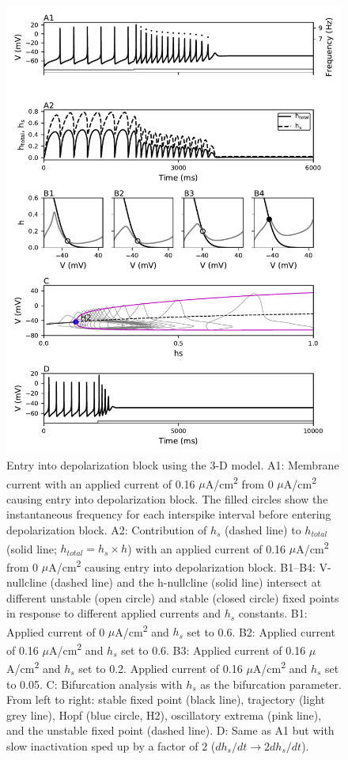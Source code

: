 \begin{figure}
	\centering
	\includegraphics[scale=0.7]{../figures/figure_3.pdf}
	\caption{Entry into depolarization block using the 3-D model. A1: Membrane current with an applied current of 0.16 $\mu$A/cm\textsuperscript{2} from 0 $\mu$A/cm\textsuperscript{2} causing entry into depolarization block. The filled circles show the instantaneous frequency for each interspike interval before entering depolarization block. A2: Contribution of $h_s$ (dashed line) to $h_{total}$ (solid line; $h_{total}= h_{s} \times h$) with an applied current of 0.16 $\mu$A/cm\textsuperscript{2} from 0 $\mu$A/cm\textsuperscript{2} causing entry into depolarization block. B1--B4: V-nullcline (dashed line) and the h-nullcline (solid line) intersect at different unstable (open circle) and stable (closed circle) fixed points in response to different applied currents and $h_s$ constants. B1: Applied current of 0 $\mu$A/cm\textsuperscript{2} and $h_s$ set to 0.6. B2: Applied current of 0.16 $\mu$A/cm\textsuperscript{2} and $h_s$ set to 0.6. B3: Applied current of 0.16 $\mu$A/cm\textsuperscript{2} and $h_s$ set to 0.2. Applied current of 0.16 $\mu$A/cm\textsuperscript{2} and $h_s$ set to 0.05. C: Bifurcation analysis with $h_s$ as the bifurcation parameter. From left to right: stable fixed point (black line), trajectory (light grey line), Hopf (blue circle, H2), oscillatory extrema (pink line), and the unstable fixed point (dashed line). D: Same as A1 but with slow inactivation sped up by a factor of 2 ($dh_s/dt \rightarrow 2dh_s/dt$).}
	\label{fig:3}
\end{figure}

